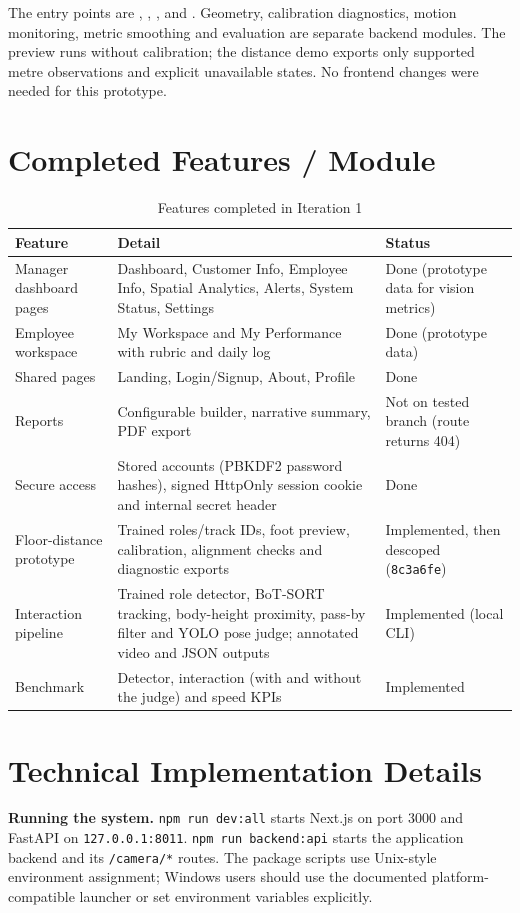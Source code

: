 The entry points are , , , and . Geometry, calibration diagnostics, motion monitoring, metric smoothing and evaluation are separate backend modules. The preview runs without calibration; the distance demo exports only supported metre observations and explicit unavailable states. No frontend changes were needed for this prototype.

\section{Completed Features / Module}
\begin{table}[H]
\centering
\caption{Features completed in Iteration 1}
\begin{tabular}{P{0.3\textwidth}P{0.4\textwidth}P{0.17\textwidth}}
\toprule
Feature & Detail & Status\\
\midrule
Manager dashboard pages & Dashboard, Customer Info, Employee Info, Spatial Analytics, Alerts, System Status, Settings & Done (prototype data for vision metrics)\\
Employee workspace & My Workspace and My Performance with rubric and daily log & Done (prototype data)\\
Shared pages & Landing, Login/Signup, About, Profile & Done\\
Reports & Configurable builder, narrative summary, PDF export & Not on tested branch (route returns 404)\\
Secure access & Stored accounts (PBKDF2 password hashes), signed HttpOnly session cookie and internal secret header & Done\\
Floor-distance prototype & Trained roles/track IDs, foot preview, calibration, alignment checks and diagnostic exports & Implemented, then descoped (\texttt{8c3a6fe})\\
Interaction pipeline & Trained role detector, BoT-SORT tracking, body-height proximity, pass-by filter and YOLO pose judge; annotated video and JSON outputs & Implemented (local CLI)\\
Benchmark & Detector, interaction (with and without the judge) and speed KPIs & Implemented\\
\bottomrule
\end{tabular}
\end{table}

\section{Technical Implementation Details}
\textbf{Running the system.} \texttt{npm run dev:all} starts Next.js on port 3000 and FastAPI on \texttt{127.0.0.1:8011}. \texttt{npm run backend:api} starts the application backend and its \texttt{/camera/*} routes. The package scripts use Unix-style environment assignment; Windows users should use the documented platform-compatible launcher or set environment variables explicitly.


